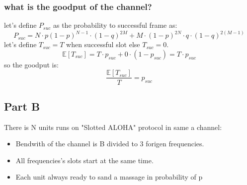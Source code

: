 \documentclass{article}
\begin{document}
\subsubsection{what is the goodput of the channel?}

let's define $P_{suc}$ as the probability to successful frame as:
\begin{equation}
     P_{suc} = N\cdot p(1-p)^{N-1}\cdot (1-q)^{2M}+M \cdot (1-p)^{2N} \cdot q \cdot (1-q)^{2(M-1)}
\end{equation}
let's define $T_{suc} = T$ when successful slot else $T_{suc} = 0$.
\begin{equation}
    \mathbb{E}[T_{suc}] = T \cdot p_{suc} + 0 \cdot (1-p_{suc}) = T \cdot p_{suc} 
\end{equation}
so the goodput is: 
\begin{equation}
    \frac{\mathbb{E}[T_{suc}]}{T} = p_{suc}
\end{equation}
\subsection{Part B}
There is N units runs on "Slotted ALOHA" protocol in same a channel:
\begin{itemize}
    \item Bendwith of the channel is B divided to 3 forigen frequencies.
    \item All frequencies's slots start at the same time.
    \item Each unit always ready to sand a massage in probability of p
\end{itemize}
\end{document}
